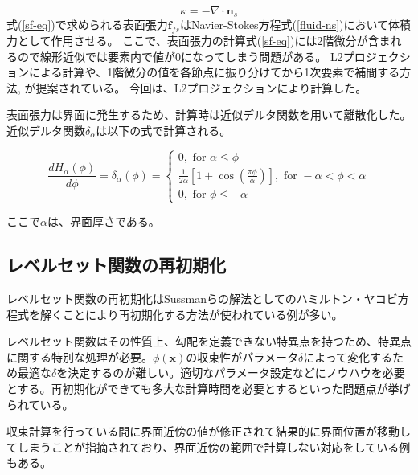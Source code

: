 \begin{equation}
\label{sf-kappa}
	\kappa = - \nabla \cdot \bm{n}_{s}
\end{equation}
式(\ref{sf-eq})で求められる表面張力$\bm{f}_{fs}$はNavier-Stokes方程式(\ref{fluid-ns})において体積力として作用させる。
ここで、表面張力の計算式(\ref{sf-eq})には2階微分が含まれるので線形近似では要素内で値が0になってしまう問題がある。
L2プロジェクションによる計算\cite{Nagrath2003}や、1階微分の値を各節点に振り分けてから1次要素で補間する方法\cite{Matsumoto2006}, \cite{Shi2019}が提案されている。
今回は、L2プロジェクションにより計算した。

表面張力は界面に発生するため、計算時は近似デルタ関数を用いて離散化した。
近似デルタ関数$\delta_{\alpha}$は以下の式で計算される。

\begin{equation}
\label{delta-function}
	\frac{d H_\alpha(\phi)}{d \phi} = \delta_\alpha(\phi) = \left\{\begin{array}{l}0, \text { for } \alpha \leq \phi \\ 
															\frac{1}{2 \alpha}\left[1+\cos \left(\frac{\pi \phi}{\alpha}\right)\right], \text { for }-\alpha<\phi<\alpha \\
															 0, \text { for } \phi \leq-\alpha\end{array}\right.
\end{equation}

ここで$\alpha$は、界面厚さである。



\subsection{レベルセット関数の再初期化}

レベルセット関数の再初期化はSussmanらの解法\cite{Sussman1994}としてのハミルトン・ヤコビ方程式を解くことにより再初期化する方法が使われている例が多い\cite{Himeno1999}。

レベルセット関数はその性質上、勾配を定義できない特異点を持つため、特異点に関する特別な処理が必要。$\phi(\bm{x})$の収束性がパラメータ$\delta$によって変化するため最適な$\delta$を決定するのが難しい。適切なパラメータ設定などにノウハウを必要とする。再初期化ができても多大な計算時間を必要とするといった問題点が挙げられている\cite{Yamazaki2007}。

収束計算を行っている間に界面近傍の値が修正されて結果的に界面位置が移動してしまうことが指摘されており、界面近傍の範囲で計算しない対応をしている例もある\cite{Tsubogo2003}。


